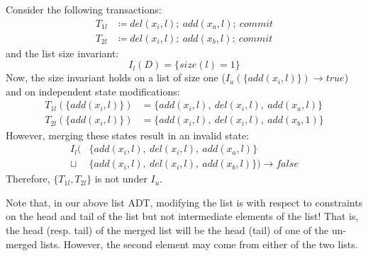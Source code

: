 \begin{claim}
Consider the following transactions:
\begin{align*}
T_{1l}&\coloneqq del(x_i, l);~add(x_a, l);~commit\\
T_{2l}&\coloneqq del(x_i, l);~add(x_b, l);~commit
\end{align*}
and the list size invariant:
$$I_l(D) = \{size(l) = 1\}$$
Now, the size invariant holds on a list of size one ($I_u(\{add(x_i, l)\}) \rightarrow true$) and on independent state modifications:
\begin{align*}
T_{1l}(\{add(x_i, l)\})&=\{add(x_i, l),~del(x_i, l),~add(x_a, l)\}\\
T_{2l}(\{add(x_i, l)\})&=\{add(x_i, l),~del(x_i, l),~add(x_b,1)\}
\end{align*}
However, merging these states result in an invalid state:
\begin{align*}
I_l(&\{add(x_i, l),~del(x_i, l),~add(x_a, l)\}\\\sqcup~&\{add(x_i, l),~del(x_i, l),~add(x_b, l)\})\rightarrow false
\end{align*}
Therefore, $\{T_{1l}, T_{2l}\}$ is not \iconfluent under $I_u$.
\end{claim}

Note that, in our above list ADT, modifying the list is \iconfluent with respect to constraints on the head and tail of the list but not intermediate elements of the list! That is, the head (resp. tail) of the merged list will be the head (tail) of one of the un-merged lists. However, the second element may come from either of the two lists.
